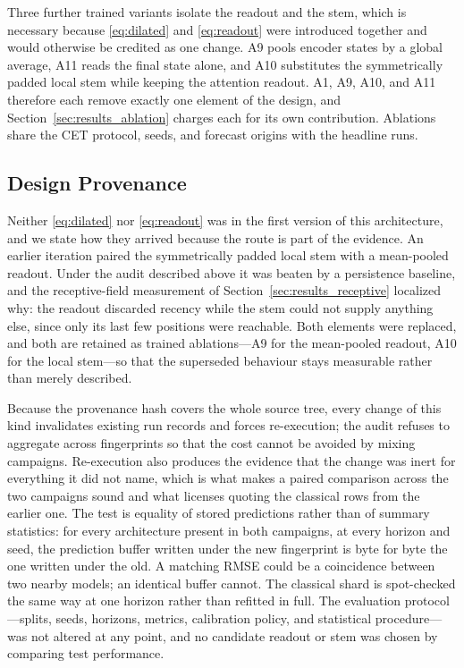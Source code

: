 Three further trained variants isolate the readout and the stem, which is necessary because \eqref{eq:dilated} and \eqref{eq:readout} were introduced together and would otherwise be credited as one change. A9 pools encoder states by a global average, A11 reads the final state alone, and A10 substitutes the symmetrically padded local stem while keeping the attention readout. A1, A9, A10, and A11 therefore each remove exactly one element of the design, and Section~\ref{sec:results_ablation} charges each for its own contribution. Ablations share the CET protocol, seeds, and forecast origins with the headline runs.

\subsection{Design Provenance}
\label{sec:correction}
Neither \eqref{eq:dilated} nor \eqref{eq:readout} was in the first version of this architecture, and we state how they arrived because the route is part of the evidence. An earlier iteration paired the symmetrically padded local stem with a mean-pooled readout. Under the audit described above it was beaten by a persistence baseline, and the receptive-field measurement of Section~\ref{sec:results_receptive} localized why: the readout discarded recency while the stem could not supply anything else, since only its last few positions were reachable. Both elements were replaced, and both are retained as trained ablations---A9 for the mean-pooled readout, A10 for the local stem---so that the superseded behaviour stays measurable rather than merely described.

Because the provenance hash covers the whole source tree, every change of this kind invalidates existing run records and forces re-execution; the audit refuses to aggregate across fingerprints so that the cost cannot be avoided by mixing campaigns. Re-execution also produces the evidence that the change was inert for everything it did not name, which is what makes a paired comparison across the two campaigns sound and what licenses quoting the classical rows from the earlier one. The test is equality of stored predictions rather than of summary statistics: for every architecture present in both campaigns, at every horizon and seed, the prediction buffer written under the new fingerprint is byte for byte the one written under the old. A matching RMSE could be a coincidence between two nearby models; an identical buffer cannot. The classical shard is spot-checked the same way at one horizon rather than refitted in full. The evaluation protocol---splits, seeds, horizons, metrics, calibration policy, and statistical procedure---was not altered at any point, and no candidate readout or stem was chosen by comparing test performance.

